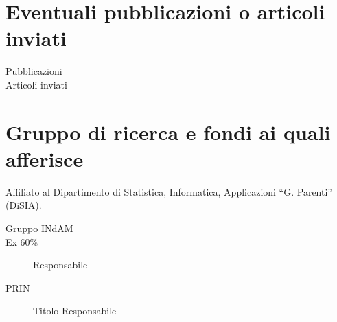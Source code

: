 \documentclass[11pt]{article}
\begin{document}
\section*{Eventuali pubblicazioni o articoli inviati}

\begin{description}


\item[Pubblicazioni] 


\item[Articoli inviati]





\end{description}




\section*{Gruppo di ricerca e fondi ai quali afferisce}

Affiliato al Dipartimento di Statistica, Informatica, Applicazioni
``G. Parenti'' (DiSIA).

\begin{description}

\item[Gruppo INdAM] %

\item[Ex 60\%] Responsabile %

\item[PRIN] Titolo\hskip 2cm Responsabile %


\end{description}


\vfill
\end{document}
